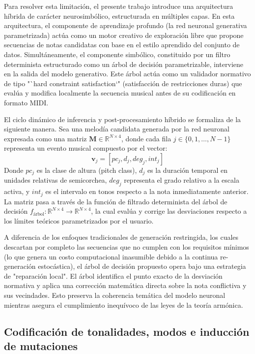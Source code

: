 \documentclass[12pt]{report}
\begin{document}
Para resolver esta limitación, el presente trabajo introduce una arquitectura híbrida de carácter neurosimbólico, estructurada en múltiples capas. En esta arquitectura, el componente de aprendizaje profundo (la red neuronal generativa parametrizada) actúa como un motor creativo de exploración libre que propone secuencias de notas candidatas con base en el estilo aprendido del conjunto de datos. Simultáneamente, el componente simbólico, constituido por un filtro determinista estructurado como un árbol de decisión parametrizable, interviene en la salida del modelo generativo. Este árbol actúa como un validador normativo de tipo "`hard constraint satisfaction`" (satisfacción de restricciones duras) que evalúa y modifica localmente la secuencia musical antes de su codificación en formato MIDI.

El ciclo dinámico de inferencia y post-procesamiento híbrido se formaliza de la siguiente manera. Sea una melodía candidata generada por la red neuronal expresada como una matriz $\mathbf{M} \in \mathbb{R}^{N \times 4}$, donde cada fila $j \in \{0, 1, \dots, N-1\}$ representa un evento musical compuesto por el vector:
\begin{equation}
    \mathbf{v}_j = [pc_j, d_j, deg_j, int_j]
\end{equation}
Donde $pc_j$ es la clase de altura (pitch class), $d_j$ es la duración temporal en unidades relativas de semicorchea, $deg_j$ representa el grado relativo a la escala activa, y $int_j$ es el intervalo en tonos respecto a la nota inmediatamente anterior. La matriz pasa a través de la función de filtrado determinista del árbol de decisión $f_{\text{árbol}}: \mathbb{R}^{N \times 4} \to \mathbb{R}^{N \times 4}$, la cual evalúa y corrige las desviaciones respecto a los límites teóricos parametrizados por el usuario. 

A diferencia de los enfoques tradicionales de generación restringida, los cuales descartan por completo las secuencias que no cumplen con los requisitos mínimos (lo que genera un costo computacional inasumible debido a la continua re-generación estocástica), el árbol de decisión propuesto opera bajo una estrategia de "reparación local". El árbol identifica el punto exacto de la desviación normativa y aplica una corrección matemática directa sobre la nota conflictiva y sus vecindades. Esto preserva la coherencia temática del modelo neuronal mientras asegura el cumplimiento inequívoco de las leyes de la teoría armónica.

\subsection{Codificación de tonalidades, modos e inducción de mutaciones}
\end{document}

